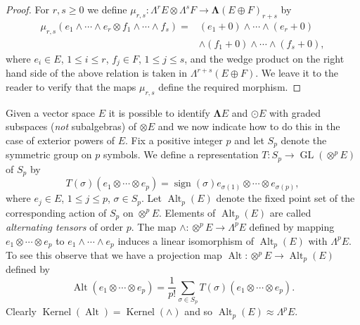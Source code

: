 \begin{proof}
For $r,s\geq0$ we define $\mu_{r,s}:\Lambda^r E\otimes\Lambda^s F\to\boldsymbol\Lambda(E\oplus F)_{r+s}$ by
\[
\begin{split}
\mu_{r,s}(e_1\wedge\cdots\wedge e_r\otimes f_1\wedge\cdots\wedge f_s)
={}&(e_1+0)\wedge\cdots\wedge(e_r+0)\\
&\wedge(f_1+0)\wedge\cdots\wedge(f_s+0),
\end{split}
\]
where $e_i\in E$, $1\leq i\leq r$, $f_j\in F$, $1\leq j\leq s$, and the wedge product on the right hand side of the above relation is taken in $\Lambda^{r+s}(E\oplus F)$. We leave it to the reader to verify that the maps $\mu_{r,s}$ define the required morphism.
\end{proof}
Given a vector space $E$ it is possible to identify $\boldsymbol\Lambda E$ and $\boldsymbol\odot E$ with graded subspaces (\emph{not} subalgebras) of $\boldsymbol\otimes E$ and we now indicate how to do this in the case of exterior powers of $E$. Fix a positive integer $p$ and let $S_p$ denote the symmetric group on $p$ symbols. We define a representation $T:S_p\to\operatorname{GL}(\otimes^p E)$ of $S_p$ by
\[
T(\sigma)(e_1\otimes\cdots\otimes e_p)=\operatorname{sign}(\sigma)e_{\sigma(1)}\otimes\cdots\otimes e_{\sigma(p)},
\]
where $e_j\in E$, $1\leq j\leq p$, $\sigma\in S_p$. Let $\operatorname{Alt}_p(E)$ denote the fixed point set of the corresponding action of $S_p$ on $\otimes^p E$. Elements of $\operatorname{Alt}_p(E)$
are called \emph{alternating tensors} of order $p$. The map $\wedge:\otimes^p E\to\Lambda^p E$ defined by mapping $e_1\otimes\cdots\otimes e_p$ to $e_1\wedge\cdots\wedge e_p$ induces a linear isomorphism of $\operatorname{Alt}_p(E)$ with $\Lambda^p E$. To see this observe that we have a projection map $\operatorname{Alt}:\otimes^p E\to\operatorname{Alt}_p(E)$ defined by
\[
\operatorname{Alt}(e_1\otimes\cdots\otimes e_p)=\frac1{p!}\sum_{\sigma\in S_p}T(\sigma)(e_1\otimes\cdots\otimes e_p).
\]
Clearly $\operatorname{Kernel}(\operatorname{Alt})=\operatorname{Kernel}(\wedge)$ and so $\operatorname{Alt}_p(E)\approx\Lambda^p E$.

